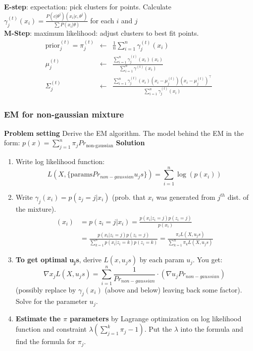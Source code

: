 \documentclass[main]{subfiles}
\begin{document}
\begin{landscape}
\begin{multicols}{4}
\textbf{E-step}: expectation: pick clusters for points.
Calculate $\gamma_j^{(t)}(x_i) = \frac{P(c|\theta^j) (x_i|c,\theta^j)}{\sum P(x_i|\theta)}$ for each $i$ and $j$\\
\textbf{M-Step}: maximum likelihood: adjust clusters to best fit points.\\
\begin{eqnarray}
\text{prior}_j^{(t)} = \pi^{(t)}_j &\leftarrow& \frac{1}{n}\sum_{i=1}^n \gamma_j^{(t)}(x_i) \\
\mu_j^{(t)} &\leftarrow& \frac{\sum_{i=1}^n \gamma_j^{(t)}(x_i)(x_i)}{\sum_{i=1}^n \gamma^{(t)}(x_i)} \\
\Sigma^{(t)}_j &\leftarrow& \frac{\sum_{i=1}^n \gamma_j^{(t)}(x_i)(x_i-\mu_j^{(t)})(x_i-\mu_j^{(t)})^\top}{\sum_{i=1}^n \gamma_j^{(t)}(x_i)}
\end{eqnarray}

\subsubsection{EM for non-gaussian mixture}
\textbf{Problem setting}
Derive the EM algorithm. The model behind the EM in the form:
\(p(x) = \sum\limits^n_{j=1}\pi_j Pr_{\text{non-gaussian}}\)
\textbf{Solution}
\begin{enumerate}[topsep=0pt,itemsep=-2ex,partopsep=1ex,parsep=1ex]
\item Write  log likelihood function:
\[L(X,\{\text{params}Pr_{non-gaussian} u_js\}) = \sum\limits^n_{i=1} \log \left( p(x_i)\right)\]
\item Write \(\gamma_j(x_i) = p(z_j = j | x_i)\) (prob. that \(x_i\) was generated from \(j^{th}\) dist. of the mixture).
\begin{align*}
(x_i) &= p(z_i = j | x_i) = \frac{p(x_i|z_i = j) p(z_i = j)}{p(x_i)}\\
&= \frac{p(x_i|z_i = j) p(z_i = j)}{\sum\limits^n_{k=1}p(x_i|z_i = k) p(z_i = k)}
= \frac{\pi_i L(X,u_js)}{\sum^n_{k=1}\pi_k L(X,u_js)}
\end{align*}
\item \textbf{To get optimal }\(\mathbf{u_js}\), derive \(L(x,u_js)\) by each param \(u_j\).
You get:
\[\nabla x_j L(X,u_js) = \sum\limits^n_{i=1}\frac{1}{Pr_{non-gaussian}} \cdot (\nabla u_j Pr_{non-gaussian})\](possibly replace by \(\gamma_j(x_i)\) (above and below) leaving back some factor). Solve for the parameter \(u_j\).
\item \textbf{Estimate the \(\pi\) parameters} by Lagrange optimization on log likelihood function and constraint \(\lambda \left(\sum\limits^k_{j=1}\pi_j -1\right) \). Put the \(\lambda\) into the formula and find the formula for \(\pi_j\).
\end{enumerate}


\end{multicols}
\end{landscape}
\end{document}
